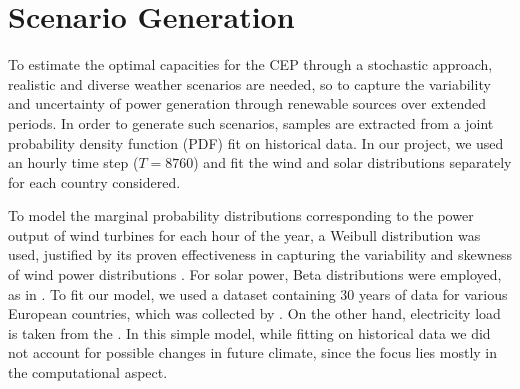 \documentclass[smallextended,natbib]{svjour3}       %
\numberwithin{definition}{section}
\numberwithin{theorem}{section}
\numberwithin{proposition}{section}
\begin{document}















\newpage
\appendix

\section{Scenario Generation}\label{generation}

To estimate the optimal capacities for the CEP through a stochastic approach, realistic and diverse weather scenarios are needed, so to capture the variability and uncertainty of power generation through renewable sources over extended periods. 
In order to generate such scenarios, samples are extracted from a joint probability density function (PDF) fit on historical data. 
In our project, we used an hourly time step ($T=8760$) and fit the wind and solar distributions separately for each country considered.

To model the marginal probability distributions corresponding to the power output of wind turbines for each hour of the year, a Weibull distribution was used, justified by its proven effectiveness in capturing the variability and skewness of wind power distributions \citep{weibullwind}. 
For solar power, Beta distributions were employed, as in \citet{betaPV}.
To fit our model, we used a dataset containing 30 years of data for various European countries, which was collected by \citet{30y_gen}. 
On the other hand, electricity load is taken from the \citet{ENTSOE_PowerStats}.
In this simple model, while fitting on historical data we did not account for possible changes in future climate, since the focus lies mostly in the computational aspect.
\end{document}

